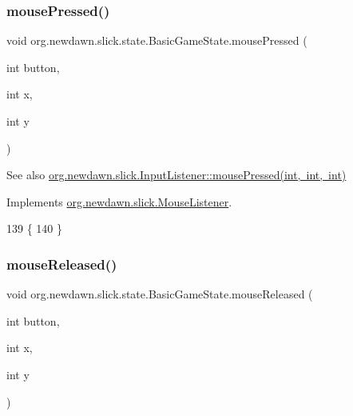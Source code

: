 \subsubsection{\texorpdfstring{mouse\+Pressed()}{mousePressed()}}
{\footnotesize\ttfamily void org.\+newdawn.\+slick.\+state.\+Basic\+Game\+State.\+mouse\+Pressed (\begin{DoxyParamCaption}\item[{int}]{button,  }\item[{int}]{x,  }\item[{int}]{y }\end{DoxyParamCaption})\hspace{0.3cm}{\ttfamily [inline]}}

\begin{DoxySeeAlso}{See also}
\mbox{\hyperlink{interfaceorg_1_1newdawn_1_1slick_1_1_mouse_listener_aeca4c21a38aa31c408f3daf6f86c0925}{org.\+newdawn.\+slick.\+Input\+Listener\+::mouse\+Pressed(int, int, int)}} 
\end{DoxySeeAlso}


Implements \mbox{\hyperlink{interfaceorg_1_1newdawn_1_1slick_1_1_mouse_listener_aeca4c21a38aa31c408f3daf6f86c0925}{org.\+newdawn.\+slick.\+Mouse\+Listener}}.


\begin{DoxyCode}
139                                                        \{
140     \}
\end{DoxyCode}
\mbox{\label{classorg_1_1newdawn_1_1slick_1_1state_1_1_basic_game_state_a80355facf11747b0ab9c25ccec5ad3d2}} 
\subsubsection{\texorpdfstring{mouse\+Released()}{mouseReleased()}}
{\footnotesize\ttfamily void org.\+newdawn.\+slick.\+state.\+Basic\+Game\+State.\+mouse\+Released (\begin{DoxyParamCaption}\item[{int}]{button,  }\item[{int}]{x,  }\item[{int}]{y }\end{DoxyParamCaption})\hspace{0.3cm}{\ttfamily [inline]}}

